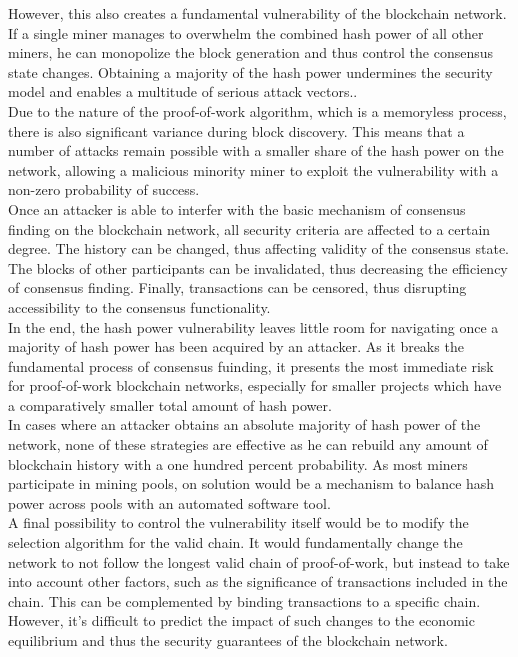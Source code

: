 \documentclass[11pt,a4paper]{article}
\begin{document}
However, this also creates a fundamental vulnerability of the blockchain network. If a single miner manages to overwhelm the combined hash power of all other miners, he can monopolize the block generation and thus control the consensus state changes. Obtaining a majority of the hash power undermines the security model and enables a multitude of serious attack vectors..\\

Due to the nature of the proof-of-work algorithm, which is a memoryless process, there is also significant variance during block discovery. This means that a number of attacks remain possible with a smaller share of the hash power on the network, allowing a malicious minority miner to exploit the vulnerability with a non-zero probability of success.\\

Once an attacker is able to interfer with the basic mechanism of consensus finding on the blockchain network, all security criteria are affected to a certain degree. The history can be changed, thus affecting validity of the consensus state. The blocks of other participants can be invalidated, thus decreasing the efficiency of consensus finding. Finally, transactions can be censored, thus disrupting accessibility to the consensus functionality.\\

In the end, the hash power vulnerability leaves little room for navigating once a majority of hash power has been acquired by an attacker. As it breaks the fundamental process of consensus fuinding, it presents the most immediate risk for proof-of-work blockchain networks, especially for smaller projects which have a comparatively smaller total amount of hash power.\\

In cases where an attacker obtains an absolute majority of hash power of the network, none of these strategies are effective as he can rebuild any amount of blockchain history with a one hundred percent probability. As most miners participate in mining pools, on solution would be a mechanism to balance hash power across pools with an automated software tool.\\

A final possibility to control the vulnerability itself would be to modify the selection algorithm for the valid chain. It would fundamentally change the network to not follow the longest valid chain of proof-of-work, but instead to take into account other factors, such as the significance of transactions included in the chain. This can be complemented by binding transactions to a specific chain. However, it's difficult to predict the impact of such changes to the economic equilibrium and thus the security guarantees of the blockchain network.\\
\end{document}
